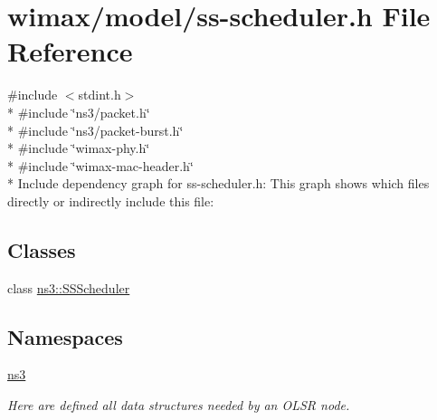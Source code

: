 \hypertarget{ss-scheduler_8h}{}\section{wimax/model/ss-\/scheduler.h File Reference}
\label{ss-scheduler_8h}
{\ttfamily \#include $<$stdint.\+h$>$}\\*
{\ttfamily \#include \char`\"{}ns3/packet.\+h\char`\"{}}\\*
{\ttfamily \#include \char`\"{}ns3/packet-\/burst.\+h\char`\"{}}\\*
{\ttfamily \#include \char`\"{}wimax-\/phy.\+h\char`\"{}}\\*
{\ttfamily \#include \char`\"{}wimax-\/mac-\/header.\+h\char`\"{}}\\*
Include dependency graph for ss-\/scheduler.h\+:
This graph shows which files directly or indirectly include this file\+:
\subsection*{Classes}
\begin{DoxyCompactItemize}
\item 
class \hyperlink{classns3_1_1SSScheduler}{ns3\+::\+S\+S\+Scheduler}
\end{DoxyCompactItemize}
\subsection*{Namespaces}
\begin{DoxyCompactItemize}
\item 
 \hyperlink{namespacens3}{ns3}
\begin{DoxyCompactList}\small\item\em Here are defined all data structures needed by an O\+L\+SR node. \end{DoxyCompactList}\end{DoxyCompactItemize}
